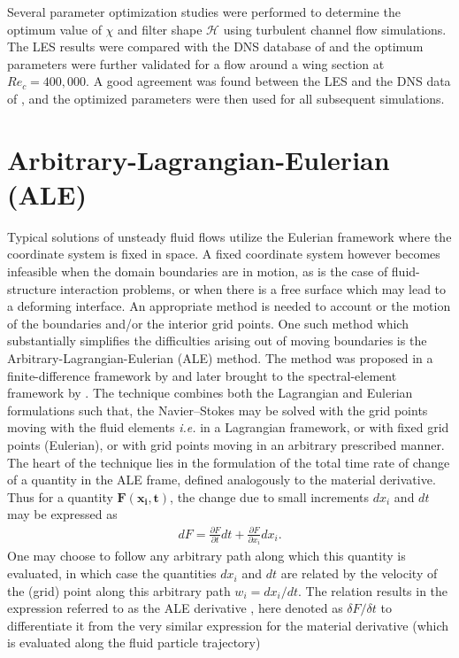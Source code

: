 Several parameter optimization studies were performed to determine the optimum value of $\chi$ and filter shape $\mathcal{H}$ using turbulent channel flow simulations. The LES results were compared with the DNS database of \cite{moser99} and the optimum parameters were further validated for a flow around a wing section at $Re_{c}=400,000$. A good agreement was found between the LES and the DNS data of \cite{hosseini16}, and the optimized parameters were then used for all subsequent simulations.

\section{Arbitrary-Lagrangian-Eulerian (ALE)}

Typical solutions of unsteady fluid flows utilize the Eulerian framework where the coordinate system is fixed in space. A fixed coordinate system however becomes infeasible when the domain boundaries are in motion, as is the case of fluid-structure interaction problems, or when there is a free surface which may lead to a deforming interface. An appropriate method is needed to account or the motion of the boundaries and/or the interior grid points. One such method which substantially simplifies the difficulties arising out of moving boundaries is the Arbitrary-Lagrangian-Eulerian (ALE) method. The method was proposed in a finite-difference framework by \cite{hirt74} and later brought to the spectral-element framework by \cite{ho90,ho91}. The technique combines both the Lagrangian and Eulerian formulations such that, the Navier--Stokes may be solved with the grid points moving with the fluid elements \textit{i.e.} in a Lagrangian framework, or with fixed grid points (Eulerian), or with grid points moving in an arbitrary prescribed manner. The heart of the technique lies in the formulation of the total time rate of change of a quantity in the ALE frame, defined analogously to the material derivative. Thus for a quantity $\mathbf{F(x_{i},t)}$, the change due to small increments $dx_{i}$ and $dt$ may be expressed as \citep{kundu02}
\begin{align}
	dF = \frac{\partial F}{\partial t}dt + \frac{\partial F}{\partial x_{i}}dx_{i}.
	\label{eqn:material_deriv_df}
\end{align}
One may choose to follow any arbitrary path along which this quantity is evaluated, in which case the quantities $dx_{i}$ and $dt$ are related by the velocity of the (grid) point along this arbitrary path $w_{i} = dx_{i}/dt$. The relation results in the expression referred to as the ALE derivative \citep{deville02}, here denoted as $\delta F/\delta t$ to differentiate it from the very similar expression for the material derivative (which is evaluated along the fluid particle trajectory)
